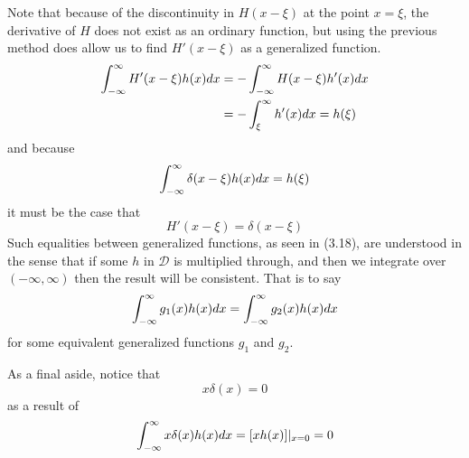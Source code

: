 Note that because of the discontinuity in \(H(x-\xi)\) at the point \(x=\xi\), the derivative of \(H\) does not exist as an ordinary function, but using the previous method does allow us to find \(H'(x-\xi)\) as a generalized function. 
\begin{equation}
    \begin{split}
        \int_{-\infty}^{\infty} H'(x-\xi)h(x)dx &= -\int_{-\infty}^{\infty} H(x-\xi)h'(x)dx\\
        &=-\int_{\xi}^{\infty}h'(x)dx = h(\xi)
    \end{split}
\end{equation}
and because
\begin{equation}
    \int_{-\infty}^{\infty} \delta(x-\xi)h(x)dx=h(\xi)
\end{equation}
it must be the case that
\begin{equation}
    H'(x-\xi) = \delta(x-\xi)
\end{equation}
Such equalities between generalized functions, as seen in (3.18), are understood in the sense that if some \(h\) in \(\mathcal{D}\) is multiplied through, and then we integrate over \((-\infty, \infty)\) then the result will be consistent. That is to say
\begin{equation}
    \int_{-\infty}^{\infty} g_1(x)h(x)dx = \int_{-\infty}^{\infty} g_2(x)h(x)dx
\end{equation}
for some equivalent generalized functions \(g_1\) and \(g_2\).

As a final aside, notice that
\begin{equation}
    x\delta(x)=0
\end{equation}
as a result of
\begin{equation}
    \int_{-\infty}^{\infty} x\delta(x)h(x)dx=[xh(x)]|_{x=0} = 0
\end{equation}